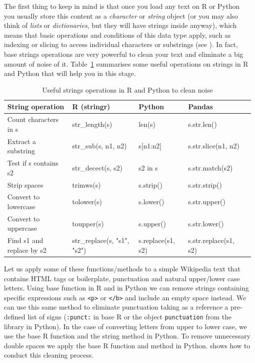 The first thing to keep in mind is that once you load any text on R or Python you usually store this content as a \emph{character} or \emph{string} object (or you may also think of \emph{lists} or \emph{dictionaries}, but they will have strings inside anyway), which means that basic operations and conditions of this data type apply, such as indexing or slicing to access individual characters or substrings (see ). In fact, base strings operations are very powerful to clean your text and eliminate a big amount of noise of it.  Table~\ref{tab:stringoperations} summarises some useful operations on strings in R and Python that will help you in this stage.   

\begin{table}
  \caption{\label{tab:stringoperations}Useful strings operations in R and Python to clean noise}{
  \begin{tabularx}{\textwidth}{lllll}
    \toprule
    String operation      & R (stringr)  & Python & Pandas\\
    \midrule
Count characters in s & str\_length(s)          & len(s)        & s.str.len()  \\
Extract a substring   & str\_sub(s, n1, n2)     & s[n1:n2] & s.str.slice(n1, n2) \\
Test if s contains s2 & str_decect(s, s2)       & s2 in s       & s.str.match(s2) \\
Strip spaces          & trimws(s)               & s.strip()     & s.str.strip() \\
Convert to lowercase  & tolower(s)              & s.lower()     & s.str.upper() \\ 
Convert to uppercase  & toupper(s)              & s.upper()     & s.str.lower() \\ 
Find s1 and replace by s2 & str_replace(s, "s1", "s2") & s.replace(s1, s2) & s.str.replace(s1, s2)  \\ 
    \bottomrule
  \end{tabularx}}{}
\end{table}

Let us apply some of these functions/methods to a simple Wikipedia text that contains HTML tags or boilerplate, punctuation and natural upper/lower case letters. Using base function  in R and  in Python we can remove strings containing specific expressions such as \texttt{<p>} or \texttt{</b>} and include an empty space instead. We can use this same method to eliminate punctuation taking as a reference a pre-defined list of signs (\texttt{:punct:} in base R or the object \texttt{punctuation} from the library  in Python). In the case of converting letters from upper to lower case, we use the base R function  and the string method  in Python. To remove unnecessary double spaces we apply the base R function  and method  in Python.  shows how to conduct this cleaning process.

